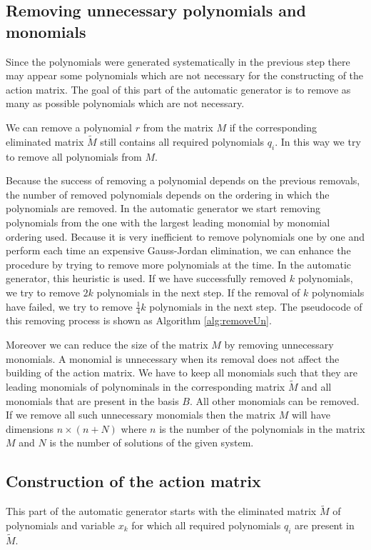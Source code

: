 \subsection{Removing unnecessary polynomials and monomials}
\label{subsec:removingUnPols}
Since the polynomials were generated systematically in the previous step there may appear some polynomials which are not necessary for the constructing of the action matrix. The goal of this part of the automatic generator is to remove as many as possible polynomials which are not necessary.

We can remove a polynomial $r$ from the matrix $M$ if the corresponding eliminated matrix $\tilde{M}$ still contains all required polynomials $q_i$. In this way we try to remove all polynomials from $M$.

Because the success of removing a polynomial depends on the previous removals, the number of removed polynomials depends on the ordering in which the polynomials are removed. In the automatic generator we start removing polynomials from the one with the largest leading monomial by monomial ordering used. Because it is very inefficient to remove polynomials one by one and perform each time an expensive Gauss-Jordan elimination, we can enhance the procedure by trying to remove more polynomials at the time. In the automatic generator, this heuristic is used. If we have successfully removed $k$ polynomials, we try to remove $2k$ polynomials in the next step. If the removal of $k$ polynomials have failed, we try to remove $\frac{1}{4}k$ polynomials in the next step. The pseudocode of this removing process is shown as Algorithm \ref{alg:removeUn}.



Moreover we can reduce the size of the matrix $M$ by removing unnecessary monomials. A monomial is unnecessary when its removal does not affect the building of the action matrix. We have to keep all monomials such that they are leading monomials of polynominals in the corresponding matrix $\tilde{M}$ and all monomials that are present in the basis $B$. All other monomials can be removed. If we remove all such unnecessary monomials then the matrix $M$ will have dimensions $n \times (n + N)$ where $n$ is the number of the polynomials in the matrix $M$ and $N$ is the number of solutions of the given system.

\subsection{Construction of the action matrix}
This part of the automatic generator starts with the eliminated matrix $\tilde{M}$ of polynomials and variable $x_k$ for which all required polynomials $q_i$ are present in $\tilde{M}$.

